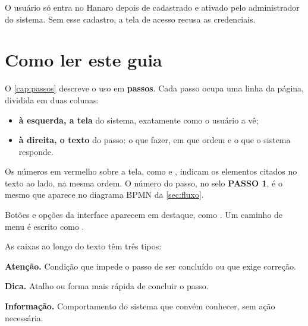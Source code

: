 \begin{remark}
O usuário só entra no Hanaro depois de cadastrado e ativado pelo administrador do
sistema. Sem esse cadastro, a tela de acesso recusa as credenciais.
\end{remark}

\section{Como ler este guia}

O \autoref{cap:passos} descreve o uso em \textbf{passos}. Cada passo ocupa uma linha
da página, dividida em duas colunas:

\begin{itemize}
    \item \textbf{à esquerda, a tela} do sistema, exatamente como o usuário a vê;
    \item \textbf{à direita, o texto} do passo: o que fazer, em que ordem e o que o
          sistema responde.
\end{itemize}

Os números em vermelho sobre a tela, como  e , indicam os elementos
citados no texto ao lado, na mesma ordem. O número do passo, no selo
\colorbox{guiavermelho}{\color{white}\guiahead\bfseries\fontsize{7.5}{7.5}\selectfont PASSO 1},
é o mesmo que aparece no diagrama BPMN da \autoref{sec:fluxo}.

Botões e opções da interface aparecem em destaque, como . Um caminho de
menu é escrito como .

As caixas ao longo do texto têm três tipos:

\begin{remark}
\textbf{Atenção.} Condição que impede o passo de ser concluído ou que exige
correção.
\end{remark}

\begin{remark}[dica]
\textbf{Dica.} Atalho ou forma mais rápida de concluir o passo.
\end{remark}

\begin{remark}[info]
\textbf{Informação.} Comportamento do sistema que convém conhecer, sem ação
necessária.
\end{remark}

%
%
\clearpage
